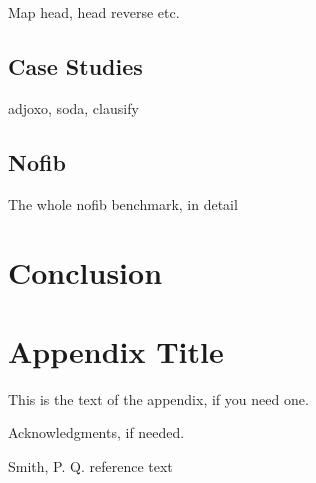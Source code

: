 \documentclass[preprint]{sigplanconf}
\begin{document}
Map head, head reverse etc.


\subsection{Case Studies}

adjoxo, soda, clausify

\subsection{Nofib}

The whole nofib benchmark, in detail

\section{Conclusion}
\label{chap:conc}






\appendix
\section{Appendix Title}

This is the text of the appendix, if you need one.

\acks

Acknowledgments, if needed.

\begin{thebibliography}{}

Smith, P. Q. reference text

\end{thebibliography}
\end{document}
